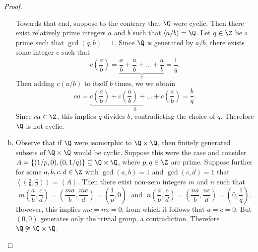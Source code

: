 \documentclass[10pt]{amsart}
\begin{document}
\begin{thm}
\begin{proof}
\begin{enumerate}[(a)]
      Towards that end, suppose to the contrary that $\Q$ were cyclic.
      Then there exist relatively prime integers $a$ and $b$ such that $\left<a/b\right> = \Q$.
      Let $q \in \Z$ be a prime such that $\gcd(q,b) = 1$.
      Since $\Q$ is generated by $a/b$, there exists some integer $c$ such that 
      $$c\left(\frac{a}{b}\right) = \underbrace{\frac{a}{b} + \frac{a}{b} + \ldots + \frac{a}{b}}_c = \frac{1}{q}.$$
      Then adding $c(a/b)$ to itself $b$ times, we we obtain 
      $$ca = \underbrace{c\left(\frac{a}{b}\right) +  c\left(\frac{a}{b}\right) + \ldots + c\left(\frac{a}{b}\right)}_b =  \frac{b}{q}.$$
      Since $ca \in \Z$, this implies $q$ divides $b$, contradicting the choice of $q$.
      Therefore $\Q$ is not cyclic.
    \item
      Observe that if $\Q$ were isomorphic to $\Q \times \Q$, then finitely generated subsets of $\Q \times \Q$ would be cyclic.
      Suppose this were the case and consider $A = \left\{(1/p, 0), (0, 1/q)\right\} \subseteq \Q \times \Q$, where $p, q \in \Z$ are prime.
      Suppose further for some $a,b,c,d \in \Z$ with $\gcd(a,b) = 1$ and $\gcd(c,d) = 1$ that $\left<(\frac{a}{b}, \frac{c}{d})\right> = \left<A\right>$.
      Then there exist non-zero integers $m$ and $n$ such that 
      $$m\left(\frac{a}{b}, \frac{c}{d}\right) = \left(\frac{ma}{b}, \frac{mc}{d}\right) = \left(\frac{1}{p},0\right) \;\text{ and }\; n\left(\frac{a}{b}, \frac{c}{d}\right) = \left(\frac{na}{b}, \frac{nc}{d}\right) = \left(0,\frac{1}{q}\right).$$
      However, this implies $mc = na = 0$, from which it follows that $a = c = 0$.
      But $(0,0)$ generates only the trivial group, a contradiction.
      Therefore $\Q \not \cong \Q \times \Q$.
    \end{enumerate}
  \end{proof}
\end{thm}
\end{document}
